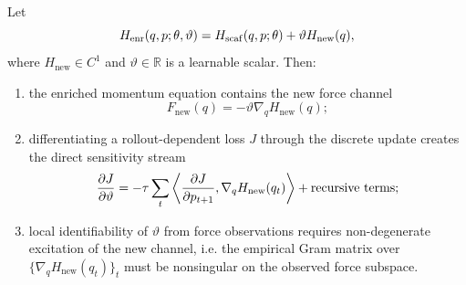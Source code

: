 \begin{lemma}
\label{lem:enrichment_channels}
Let
\[
    H_{\rm enr}(q,p;\theta,\vartheta)
    =
    H_{\rm scaf}(q,p;\theta)+\vartheta H_{\mathrm{new}}(q),
\]
where \(H_{\mathrm{new}}\in C^1\) and \(\vartheta\in\mathbb R\) is a learnable scalar.
Then:
\begin{enumerate}
    \item the enriched momentum equation contains the new force channel
    \[
        F_{\mathrm{new}}(q)=-\vartheta\nabla_q H_{\mathrm{new}}(q);
    \]
    \item differentiating a rollout-dependent loss \(J\) through the discrete update
    creates the direct sensitivity stream
    \[
        \frac{\partial J}{\partial \vartheta}
        =
        -\tau\sum_t
        \left\langle
        \frac{\partial J}{\partial p_{t+1}},
        \nabla_qH_{\mathrm{new}}(q_t)
        \right\rangle
        +
        \textnormal{recursive terms};
    \]
    \item local identifiability of \(\vartheta\) from force observations requires
    non-degenerate excitation of the new channel, i.e. the empirical Gram matrix
    over \(\{\nabla_qH_{\mathrm{new}}(q_t)\}_t\) must be nonsingular on the
    observed force subspace.
\end{enumerate}
\end{lemma}

